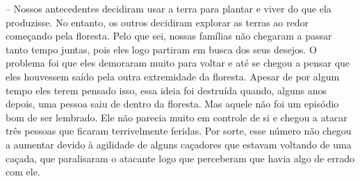 -- Nossos antecedentes decidiram usar a terra para plantar e viver do que ela produzisse. No entanto, os outros decidiram explorar as terras ao redor começando pela floresta. Pelo que sei, nossas famílias não chegaram a passar tanto tempo juntas, pois eles logo partiram em busca dos seus desejos. O problema foi que eles demoraram muito para voltar e até se chegou a pensar que eles houvessem saído pela outra extremidade da floresta. Apesar de por algum tempo eles terem pensado isso, essa ideia foi destruída quando, alguns anos depois, uma pessoa saiu de dentro da floresta. Mas aquele não foi um episódio bom de ser lembrado. Ele não parecia muito em controle de si e chegou a atacar três pessoas que ficaram terrivelmente feridas. Por sorte, esse número não chegou a aumentar devido à agilidade de alguns caçadores que estavam voltando de uma caçada, que paralisaram o atacante logo que perceberam que havia algo de errado com ele.